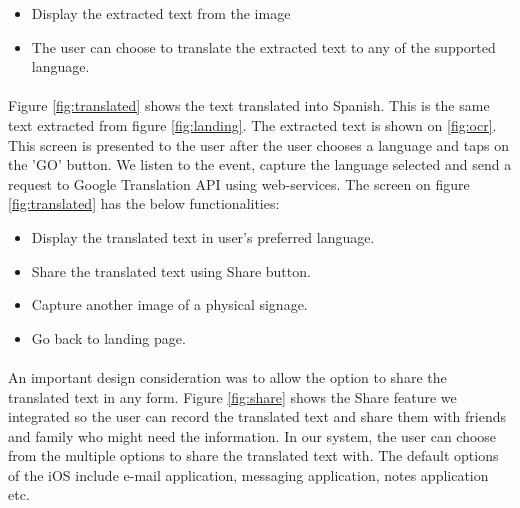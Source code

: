 \documentclass[12pt]{article}
\begin{document}
\begin{itemize}
	\item Display the extracted text from the image
	\item The user can choose to translate the extracted text to any of the supported language. 
\end{itemize}



\paragraph{}Figure \ref{fig:translated} shows the text translated into Spanish. This is the same text extracted from figure \ref{fig:landing}. The extracted text is shown on \ref{fig:ocr}. This screen is presented to the user after the user chooses a language and taps on the 'GO' button. We listen to the event, capture the language selected and send a request to Google Translation API using web-services. The screen on figure \ref{fig:translated} has the below functionalities:

\begin{itemize}
	\item Display the translated text in user's preferred language.
	\item Share the translated text using Share button.
	\item Capture another image of a physical signage.
	\item Go back to landing page.
\end{itemize}

\paragraph{}An important design consideration was to allow the option to share the translated text in any form. Figure \ref{fig:share} shows the Share feature we integrated so the user can record the translated text and share them with friends and family who might need the information. In our system, the user can choose from the multiple options to share the translated text with. The default options of the iOS include e-mail application, messaging application, notes application etc. 
\end{document}
